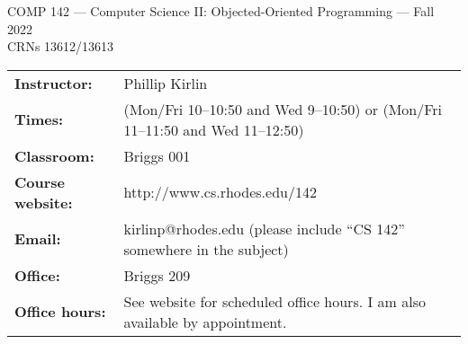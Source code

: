 \documentclass [letterpaper,11pt]{article}
\begin{document}
\begin{center}
\large COMP 142 --- Computer Science II: Objected-Oriented Programming --- Fall 2022
\\ \normalsize CRNs 13612/13613
\end{center}

\noindent\begin{tabular}{@{}ll}
\textbf{Instructor:} & Phillip Kirlin \\
\textbf{Times:} & (Mon/Fri 10--10:50 and Wed 9--10:50) or (Mon/Fri 11--11:50 and Wed 11--12:50) \\
\textbf{Classroom:} & Briggs 001 \\
\textbf{Course website:} & http://www.cs.rhodes.edu/142\\
\textbf{Email:} &kirlinp@rhodes.edu (please include ``CS 142'' somewhere in the subject)\\
\textbf{Office:} & Briggs 209\\
\textbf{Office hours:} & See website for scheduled office hours.  I am also available by appointment.\\
\end{tabular}
\end{document}
